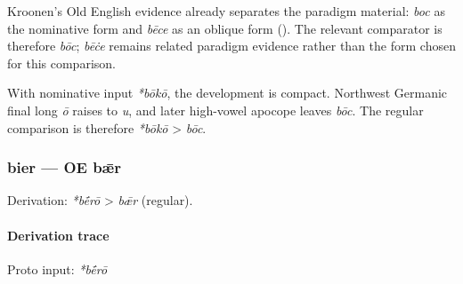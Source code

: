 \documentclass[
  british,
  a4paper,
]{article}
\begin{document}
Kroonen's Old English evidence already separates the paradigm material:
\emph{boc} as the nominative form and \emph{bēce} as an oblique form
(). The relevant comparator is
therefore \emph{bōc}; \emph{bēċe} remains related paradigm evidence
rather than the form chosen for this comparison.

With nominative input \emph{*bōkō}, the development is compact.
Northwest Germanic final long \emph{ō} raises to \emph{u}, and later
high-vowel apocope leaves \emph{bōc}. The regular comparison is
therefore \emph{*bōkō} \textgreater{} \emph{bōc}.

\subsubsection{bier --- OE bǣr}\label{bier-oe-bux1e3r-1}

Derivation: \emph{*bḗrō} \textgreater{} \emph{bǣr} (regular).

\paragraph{Derivation trace}\label{derivation-trace-14}

Proto input: \emph{*bḗrō}

\begingroup
\setlength{\fboxsep}{6pt}
\end{document}
